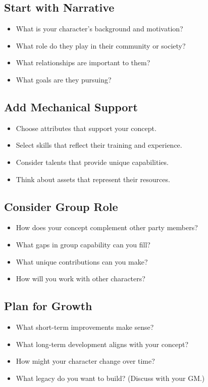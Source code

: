 \subsection*{Start with Narrative}
\begin{itemize}
\item What is your character's background and motivation?
\item What role do they play in their community or society?
\item What relationships are important to them?
\item What goals are they pursuing?
\end{itemize}

\subsection*{Add Mechanical Support}
\begin{itemize}
\item Choose attributes that support your concept.
\item Select skills that reflect their training and experience.
\item Consider talents that provide unique capabilities.
\item Think about assets that represent their resources.
\end{itemize}

\subsection*{Consider Group Role}
\begin{itemize}
\item How does your concept complement other party members?
\item What gaps in group capability can you fill?
\item What unique contributions can you make?
\item How will you work with other characters?
\end{itemize}

\subsection*{Plan for Growth}
\begin{itemize}
\item What short-term improvements make sense?
\item What long-term development aligns with your concept?
\item How might your character change over time?
\item What legacy do you want to build? (Discuss with your GM.)
\end{itemize}

